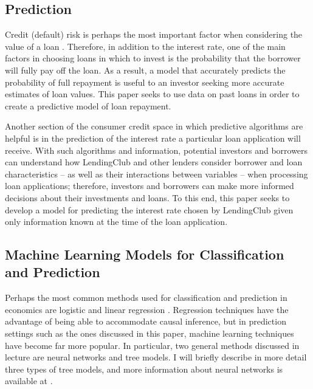 \documentclass[12pt]{article}
\begin{document}

\subsection{Prediction}

Credit (default) risk is perhaps the most important factor when considering the value of a loan \cite{diette2000how}. Therefore, in addition to the interest rate, one of the main factors in choosing loans in which to invest is the probability that the borrower will fully pay off the loan. As a result, a model that accurately predicts the probability of full repayment is useful to an investor seeking more accurate estimates of loan values. This paper seeks to use data on past loans in order to create a predictive model of loan repayment. 

Another section of the consumer credit space in which predictive algorithms are helpful is in the prediction of the interest rate a particular loan application will receive. With such algorithms and information, potential investors and borrowers can understand how LendingClub and other lenders consider borrower and loan characteristics -- as well as their interactions between variables -- when processing loan applications; therefore, investors and borrowers can make more informed decisions about their investments and loans. To this end, this paper seeks to develop a model for predicting the interest rate chosen by LendingClub given only information known at the time of the loan application. 

\subsection{Machine Learning Models for Classification and Prediction}

Perhaps the most common methods used for classification and prediction in economics are logistic and linear regression \cite{menard2018applied}. Regression techniques have the advantage of being able to accommodate causal inference, but in prediction settings such as the ones discussed in this paper, machine learning techniques have become far more popular. In particular, two general methods discussed in lecture are neural networks and tree models. I will briefly describe in more detail three types of tree models, and more information about neural networks is available at \cite{haykin2004neural}.
\end{document}
